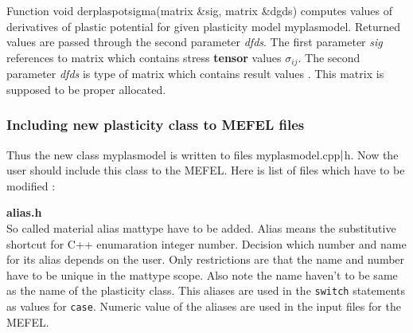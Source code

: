 Function {\sf void derplaspotsigma(matrix \&sig, matrix \&dgds)} computes values of derivatives of plastic
potential  for given plasticity model {\sf myplasmodel}. Returned values are passed
through the second parameter {\it dfds}. The first parameter {\it sig} references to matrix which contains
stress {\bf tensor} values $\sigma_{ij}$. The second parameter {\it dfds} is type of matrix which contains
result values . This matrix is supposed to be proper allocated.\\

\subsubsection {Including new plasticity class to MEFEL files}
Thus the new class {\sf myplasmodel} is written to files  myplasmodel.cpp${\rm |}$h. Now the user should
include this class to the MEFEL. Here is list of files which have to be modified :

{\bf alias.h}\\
So called material alias {\sf mattype} have to be added. Alias means the substitutive shortcut
for C++ enumaration integer number. Decision which number and name for its alias depends on the user.
Only restrictions are that the name and number have to be unique in the {\sf mattype} scope. Also note
the name haven't to be same as the name of the plasticity class. This aliases are used in the
{\tt switch} statements as values for {\tt case}. Numeric value of the aliases are used in the input
files for the MEFEL.\\

